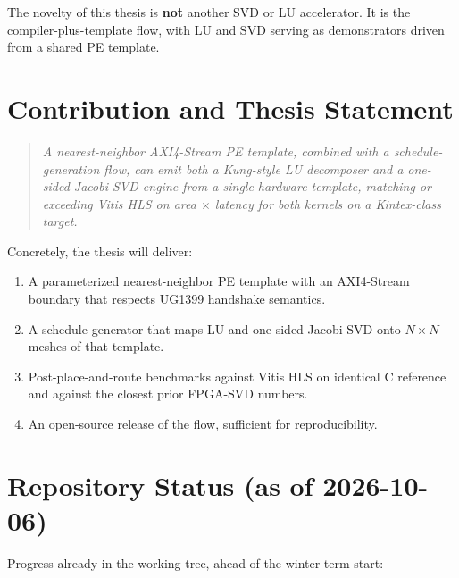 \documentclass[11pt,letterpaper]{article}
\begin{document}
The novelty of this thesis is \textbf{not} another SVD or LU accelerator. It is the compiler-plus-template flow, with LU and SVD serving as demonstrators driven from a shared PE template.

\section{Contribution and Thesis Statement}

\begin{quote}\itshape
A nearest-neighbor AXI4-Stream PE template, combined with a schedule-generation flow, can emit both a Kung-style LU decomposer and a one-sided Jacobi SVD engine from a single hardware template, matching or exceeding Vitis HLS on area $\times$ latency for both kernels on a Kintex-class target.
\end{quote}

Concretely, the thesis will deliver:

\begin{enumerate}
  \item A parameterized nearest-neighbor PE template with an AXI4-Stream boundary that respects UG1399 handshake semantics.
  \item A schedule generator that maps LU and one-sided Jacobi SVD onto $N \times N$ meshes of that template.
  \item Post-place-and-route benchmarks against Vitis HLS on identical C reference and against the closest prior FPGA-SVD numbers.
  \item An open-source release of the flow, sufficient for reproducibility.
\end{enumerate}

\section{Repository Status (as of 2026-10-06)}

Progress already in the working tree, ahead of the winter-term start:
\end{document}
